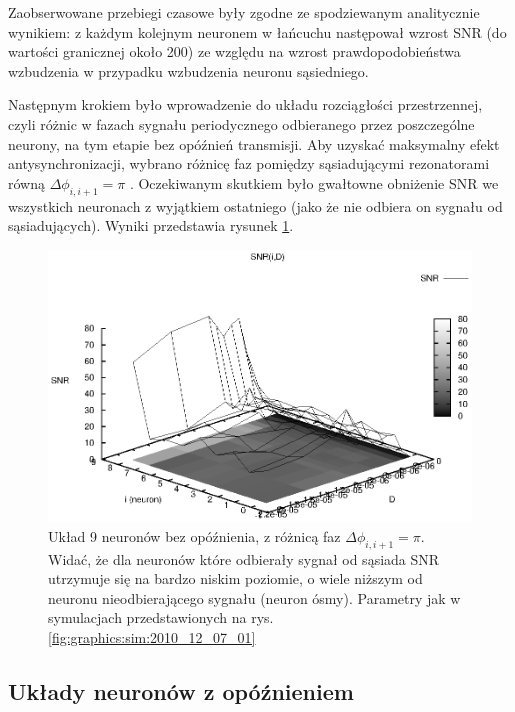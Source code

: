   Zaobserwowane przebiegi czasowe były zgodne ze spodziewanym analitycznie wynikiem: z każdym kolejnym neuronem w łańcuchu następował wzrost SNR (do wartości granicznej około 200) ze względu na wzrost prawdopodobieństwa wzbudzenia w przypadku wzbudzenia neuronu sąsiedniego.



  Następnym krokiem było wprowadzenie do układu rozciągłości przestrzennej, czyli różnic w fazach sygnału periodycznego odbieranego przez poszczególne neurony, na tym etapie bez opóźnień transmisji. Aby uzyskać maksymalny efekt antysynchronizacji, wybrano różnicę faz pomiędzy sąsiadującymi rezonatorami równą $\Delta \phi_{i,i+1} = \pi $ . Oczekiwanym skutkiem było gwałtowne obniżenie SNR we wszystkich neuronach z wyjątkiem ostatniego (jako że nie odbiera on sygnału od sąsiadujących). Wyniki przedstawia rysunek \ref{fig:graphics:sim:2010_12_06_01}.

  \begin{figure}
    \includegraphics[width=140mm]{images/9neuron/2010_12_06_01}
    \caption{Układ 9 neuronów bez opóźnienia, z różnicą faz $\Delta \phi_{i,i+1} = \pi $. Widać, że dla neuronów które odbierały sygnał od sąsiada SNR utrzymuje się na bardzo niskim poziomie, o wiele niższym od neuronu nieodbierającego sygnału (neuron ósmy). Parametry jak w symulacjach przedstawionych na rys. \ref{fig:graphics:sim:2010_12_07_01}}
    \label{fig:graphics:sim:2010_12_06_01}
  \end{figure}


  \subsection{Układy neuronów z opóźnieniem}

